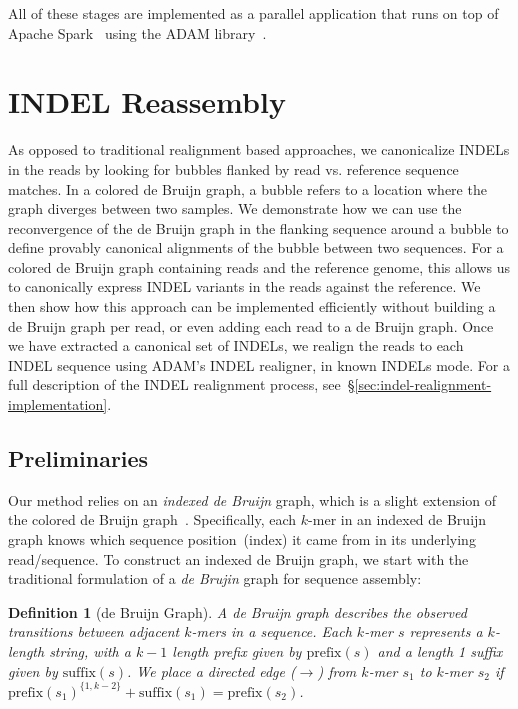 \documentclass[phd]{ucbthesis}
\newtheorem{defn}{Definition}
\begin{document}
All of these stages are implemented as a parallel application that runs on top of
{Apache Spark}~\cite{zaharia10, zaharia12} using the {ADAM}
library~\cite{massie13, nothaft15}.

\section{INDEL Reassembly}
\label{sec:indel-reassembly}

As opposed to traditional realignment based approaches, we canonicalize INDELs
in the reads by looking for bubbles flanked by read vs. reference sequence matches. In a colored de Bruijn
graph, a bubble refers to a location where the graph diverges between two
samples. We demonstrate how we can use the
reconvergence of the de Bruijn graph in the flanking sequence around a bubble
to define provably canonical alignments of the bubble between two sequences.
For a colored de Bruijn graph containing reads and the reference genome, this
allows us to canonically express INDEL variants in the reads against the
reference. We then show how this approach
can be implemented efficiently without building a de Bruijn graph per read,
or even adding each read to a de Bruijn graph. Once we have extracted a
canonical set of INDELs, we realign the reads to each INDEL sequence using
{ADAM}'s INDEL realigner, in known INDELs mode. For a full description
of the INDEL realignment process, see~\S\ref{sec:indel-realignment-implementation}.

\subsection{Preliminaries}
\label{sec:formulation}

Our method relies on an \emph{indexed de Bruijn} graph, which is a slight
extension of the colored de Bruijn graph~\cite{iqbal12}. Specifically, each
$k$-mer in an indexed de Bruijn graph knows which sequence position~(index)
it came from in its underlying read/sequence. To construct an indexed de
Bruijn graph, we start with the traditional formulation of a \emph{de Brujin}
graph for sequence assembly:

\begin{defn}[de Bruijn Graph]
\label{defn:dbg}
A de Bruijn graph describes the observed transitions between adjacent $k$-mers in a sequence. Each
$k$-mer $s$ represents a $k$-length string, with a $k - 1$ length prefix given by $\text{prefix}(s)$ and a
length 1 suffix given by $\text{suffix}(s)$. We place a directed edge ($\rightarrow$) from $k$-mer $s_1$ to
$k$-mer $s_2$ if $\text{prefix}(s_1)^{\{1, k - 2\}} + \text{suffix}(s_1) = \text{prefix}(s_2)$.
\end{defn}
\end{document}

